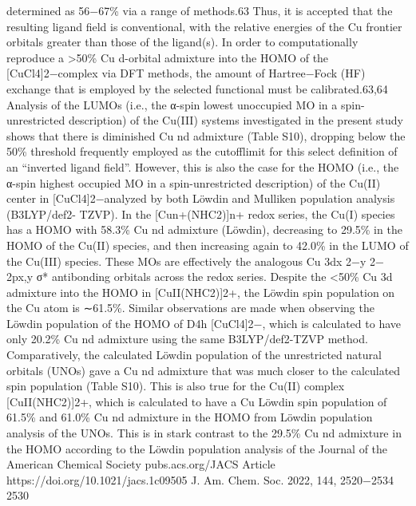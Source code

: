 \documentclass{article}
\begin{document}
determined as 56−67\% via a range of methods.63 Thus, it is
accepted that the resulting ligand ﬁeld is conventional, with the
relative energies of the Cu frontier orbitals greater than those
of the ligand(s). In order to computationally reproduce a
>50\% Cu d-orbital admixture into the HOMO of the
[CuCl4]2−complex via DFT methods, the amount of
Hartree−Fock (HF) exchange that is employed by the selected
functional must be calibrated.63,64 Analysis of the LUMOs (i.e.,
the α-spin lowest unoccupied MO in a spin-unrestricted
description) of the Cu(III) systems investigated in the present
study shows that there is diminished Cu nd admixture (Table
S10), dropping below the 50\% threshold frequently employed
as the cutoﬀlimit for this select deﬁnition of an “inverted
ligand ﬁeld”. However, this is also the case for the HOMO
(i.e., the α-spin highest occupied MO in a spin-unrestricted
description) of the Cu(II) center in [CuCl4]2−analyzed by
both Löwdin and Mulliken population analysis (B3LYP/def2-
TZVP). In the [Cun+(NHC2)]n+ redox series, the Cu(I)
species has a HOMO with 58.3\% Cu nd admixture (Löwdin),
decreasing to 29.5\% in the HOMO of the Cu(II) species, and
then increasing again to 42.0\% in the LUMO of the Cu(III)
species. These MOs are eﬀectively the analogous Cu 3dx
2−y
2−
2px,y σ* antibonding orbitals across the redox series.
Despite the <50\% Cu 3d admixture into the HOMO in
[CuII(NHC2)]2+, the Löwdin spin population on the Cu atom
is ∼61.5\%. Similar observations are made when observing the
Löwdin population of the HOMO of D4h [CuCl4]2−, which is
calculated to have only 20.2\% Cu nd admixture using the same
B3LYP/def2-TZVP method. Comparatively, the calculated
Löwdin population of the unrestricted natural orbitals (UNOs)
gave a Cu nd admixture that was much closer to the calculated
spin population (Table S10). This is also true for the Cu(II)
complex [CuII(NHC2)]2+, which is calculated to have a Cu
Löwdin spin population of 61.5\% and 61.0\% Cu nd admixture
in the HOMO from Löwdin population analysis of the UNOs.
This is in stark contrast to the 29.5\% Cu nd admixture in the
HOMO according to the Löwdin population analysis of the
Journal of the American Chemical Society
pubs.acs.org/JACS
Article
https://doi.org/10.1021/jacs.1c09505
J. Am. Chem. Soc. 2022, 144, 2520−2534
2530

\newpage

\end{document}
